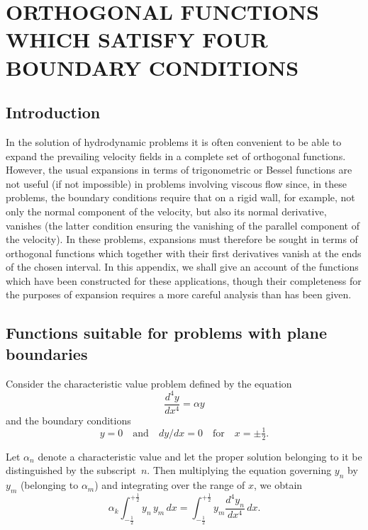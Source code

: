 \chapter{ORTHOGONAL FUNCTIONS WHICH SATISFY FOUR BOUNDARY CONDITIONS}
\label{app:V}

\section{Introduction}
\label{sec:132}

In the solution of hydrodynamic problems it is often convenient to be
able to expand the prevailing velocity fields in a complete set of orthogonal functions. However, the usual expansions in terms of trigonometric or Bessel functions are not useful (if not impossible) in problems
involving viscous flow since, in these problems, the boundary conditions
require that on a rigid wall, for example, not only the normal component
of the velocity, but also its normal derivative, vanishes (the latter
condition ensuring the vanishing of the parallel component of the
velocity). In these problems, expansions must therefore be sought in
terms of orthogonal functions which together with their first derivatives
vanish at the ends of the chosen interval. In this appendix, we shall
give an account of the functions which have been constructed for these
applications, though their completeness for the purposes of expansion
requires a more careful analysis than has been given.

\section{Functions suitable for problems with plane boundaries}
\label{sec:133}

Consider the characteristic value problem defined by the equation
\begin{equation}
\label{eq:A5-1}
\frac{d^4 y}{dx^4} = \alpha y
\end{equation}
and the boundary conditions
\begin{equation}
\label{eq:A5-2}
y = 0 \quad \text{and} \quad dy/dx = 0 \quad \text{for} \quad x = \pm\tfrac{1}{2}.
\end{equation}

Let $\alpha_n$ denote a characteristic value and let the proper solution belonging to it be distinguished by the subscript~$n$. Then multiplying the
equation governing $y_n$ by $y_m$ (belonging to $\alpha_m$) and integrating over the
range of $x$, we obtain
\begin{equation}
\label{eq:A5-3}
\alpha_k \int_{-\frac{1}{2}}^{+\frac{1}{2}} y_n \, y_m \, dx = \int_{-\frac{1}{2}}^{+\frac{1}{2}} y_m \frac{d^4 y_n}{dx^4} \, dx.
\end{equation}

